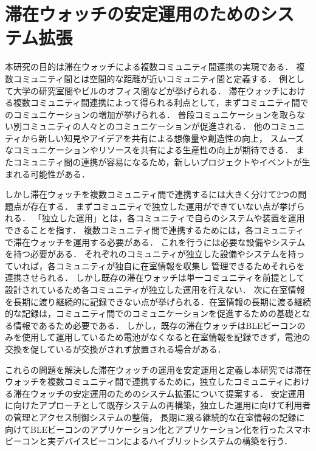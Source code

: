 \section{滞在ウォッチの安定運用のためのシステム拡張}\label{1.2}

本研究の目的は滞在ウォッチによる複数コミュニティ間連携の実現である．
複数コミュニティ間とは空間的な距離が近いコミュニティ間と定義する．
例として大学の研究室間やビルのオフィス間などが挙げられる．
滞在ウォッチにおける複数コミュニティ間連携によって得られる利点として，まずコミュニティ間でのコミュニケーションの増加が挙げられる．
普段コミュニケーションを取らない別コミュニティの人々とのコミュニケーションが促進される．
他のコミュニティから新しい知見やアイデアを共有による想像量や創造性の向上，
スムーズなコミュニケーションやリソースを共有による生産性の向上が期待できる．
またコミュニティ間の連携が容易になるため，新しいプロジェクトやイベントが生まれる可能性がある．

しかし滞在ウォッチを複数コミュニティ間で連携するには大きく分けて2つの問題点が存在する．
まずコミュニティで独立した運用ができていない点が挙げられる．
「独立した運用」とは，各コミュニティで自らのシステムや装置を運用できることを指す．
複数コミュニティ間で連携するためには，各コミュニティで滞在ウォッチを運用する必要がある．
これを行うには必要な設備やシステムを持つ必要がある．
それぞれのコミュニティが独立した設備やシステムを持っていれば，各コミュニティが独自に在室情報を収集し
管理できるためそれらを連携させられる．
しかし既存の滞在ウォッチは単一コミュニティを前提として設計されているため各コミュニティが独立した運用を行えない．
次に在室情報を長期に渡り継続的に記録できない点が挙げられる．在室情報の長期に渡る継続的な記録は，コミュニティ間でのコミュニケーションを促進するための基礎となる情報であるため必要である．
しかし，既存の滞在ウォッチはBLEビーコンのみを使用して運用しているため電池がなくなると在室情報を記録できず，電池の交換を促しているが交換がされず放置される場合がある．

これらの問題を解決した滞在ウォッチの運用を安定運用と定義し本研究では滞在ウォッチを複数コミュニティ間で連携するために，独立したコミュニティにおける滞在ウォッチの安定運用のためのシステム拡張について提案する．
安定運用に向けたアプローチとして既存システムの再構築，独立した運用に向けて利用者の管理とアクセス制御システムの整備，
長期に渡る継続的な在室情報の記録に向けてBLEビーコンのアプリケーション化とアプリケーション化を行ったスマホビーコンと実デバイスビーコンによるハイブリットシステムの構築を行う．





